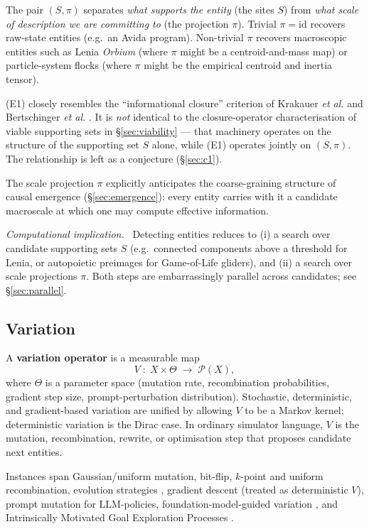 \documentclass[journal]{IEEEtran}
\theoremstyle{plain}
\theoremstyle{definition}
\theoremstyle{plain}
\newenvironment{implnote}[1][Computational implication]{%
  \par\smallskip\noindent\emph{#1.}\ }{\par\smallskip}
\newcommand{\Pmeas}{\mathcal{P}}
\begin{document}
The pair $(S,\pi)$ separates \emph{what supports the entity} (the sites $S$)
from \emph{what scale of description we are committing to} (the projection
$\pi$). Trivial $\pi=\mathrm{id}$ recovers raw-state entities (e.g.\ an Avida
program). Non-trivial $\pi$ recovers macroscopic entities such as Lenia
\emph{Orbium} (where $\pi$ might be a centroid-and-mass map) or
particle-system flocks (where $\pi$ might be the empirical centroid and
inertia tensor).

(E1) closely resembles the ``informational closure'' criterion of
Krakauer \emph{et al.} \cite{krakauer2020individuality} and Bertschinger
\emph{et al.} \cite{bertschinger2008autonomy}. It is
\emph{not} identical to the closure-operator characterisation of viable
supporting sets in \S\ref{sec:viability} --- that machinery operates on the
structure of the supporting set $S$ alone, while (E1) operates jointly on
$(S,\pi)$. The relationship is left as a conjecture
(\S\ref{sec:c1}).

The scale projection $\pi$ explicitly anticipates the coarse-graining
structure of causal emergence (\S\ref{sec:emergence}): every entity carries
with it a candidate macroscale at which one may compute effective
information.

\begin{implnote}
Detecting entities reduces to (i) a search over candidate supporting sets $S$
(e.g.\ connected components above a threshold for Lenia, or autopoietic
preimages for Game-of-Life gliders), and (ii) a search over scale projections
$\pi$. Both steps are embarrassingly parallel across candidates; see
\S\ref{sec:parallel}.
\end{implnote}

\subsection{Variation}\label{sec:variation}

A \textbf{variation operator} is a measurable map
\[
  V \;:\; X \times \Theta \;\to\; \Pmeas(X),
\]
where $\Theta$ is a parameter space (mutation rate, recombination
probabilities, gradient step size, prompt-perturbation distribution).
Stochastic, deterministic, and gradient-based variation are unified by
allowing $V$ to be a Markov kernel; deterministic variation is the Dirac case.
In ordinary simulator language, $V$ is the mutation, recombination, rewrite,
or optimisation step that proposes candidate next entities.

Instances span Gaussian/uniform mutation, bit-flip, $k$-point and uniform
recombination, evolution strategies \cite{salimans2017es}, gradient descent
(treated as deterministic $V$), prompt mutation for LLM-policies,
foundation-model-guided variation \cite{lehman2024large}, and Intrinsically
Motivated Goal Exploration Processes \cite{forestier2022imgep}.
\end{document}
